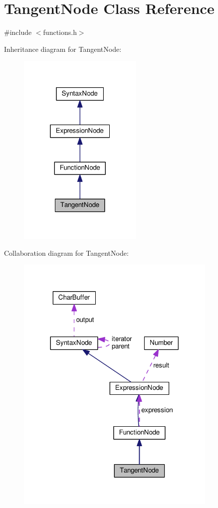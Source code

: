 \hypertarget{classTangentNode}{}\section{Tangent\+Node Class Reference}
\label{classTangentNode}


{\ttfamily \#include $<$functions.\+h$>$}



Inheritance diagram for Tangent\+Node\+:\nopagebreak
\begin{figure}[H]
\begin{center}
\leavevmode
\includegraphics[width=169pt]{classTangentNode__inherit__graph}
\end{center}
\end{figure}


Collaboration diagram for Tangent\+Node\+:\nopagebreak
\begin{figure}[H]
\begin{center}
\leavevmode
\includegraphics[width=272pt]{classTangentNode__coll__graph}
\end{center}
\end{figure}
